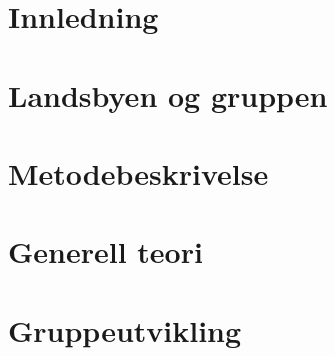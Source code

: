 \documentclass[DIV=calc, paper=a4, fontsize=12pt]{scrartcl}	 %
\begin{document}
\section{Innledning}

\begin{multicols}{2}

\end{multicols}


\section{Landsbyen og gruppen}

\begin{multicols}{2}



\end{multicols}


\section{Metodebeskrivelse}

\begin{multicols}{2}

\end{multicols}


\section{Generell teori}

\begin{multicols}{2}

\end{multicols}


\section{Gruppeutvikling}

\begin{multicols}{2}

\end{multicols}
\end{document}
